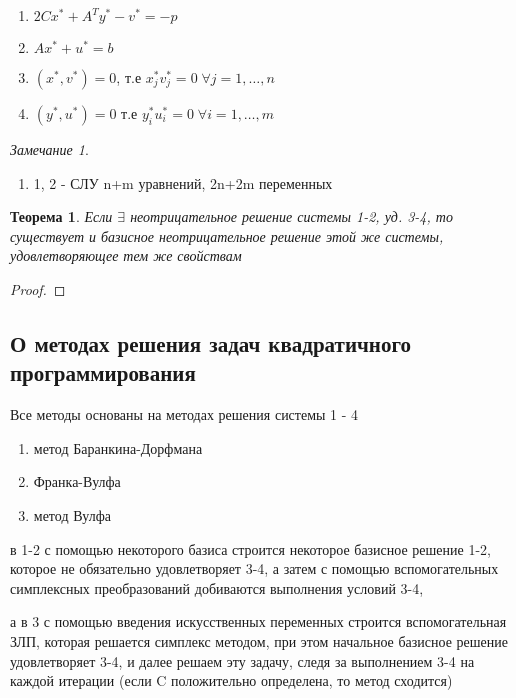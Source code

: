 \documentclass[a4paper]{article}
\newtheorem{theorem}{Теорема}[section]
\theoremstyle{definition}
\theoremstyle{remark}
\newtheorem*{remark}{Замечание}
\begin{document}
\begin{enumerate}
    \item $2Cx^* + A^T y^* - v^* = -p$
    \item $Ax^* + u^* = b$
    \item $(x^*, v^*) = 0$, т.е $x_j^* v_j^* = 0\; \forall j = 1, \dots, n$
    \item $(y^*, u^*) = 0$ т.е $y_i^* u_i^* = 0\; \forall i = 1, \dots, m$
\end{enumerate}  
\begin{remark}
    \begin{enumerate}
        \item 1, 2 - СЛУ n+m уравнений, 2n+2m переменных
    \end{enumerate}
\end{remark}
\begin{theorem}
    Если $\exists$ неотрицательное решение системы 1-2, уд. 3-4, то существует и базисное неотрицательное решение этой же системы, удовлетворяющее тем же свойствам
\end{theorem}
\begin{proof}

\end{proof}
\subsection{О методах решения задач квадратичного программирования}
Все методы основаны на методах решения системы 1 - 4 

\begin{enumerate}
    \item метод Баранкина-Дорфмана
    \item Франка-Вулфа
    \item метод Вулфа
\end{enumerate}
в 1-2 с помощью некоторого базиса строится некоторое базисное решение 1-2, которое не обязательно удовлетворяет 3-4, а затем с помощью вспомогательных симплексных преобразований добиваются выполнения условий 3-4,

а в 3 с помощью введения искусственных переменных строится вспомогательная ЗЛП, которая решается симплекс методом, при этом начальное базисное решение удовлетворяет 3-4, и далее решаем эту задачу, следя за выполнением 3-4 на каждой итерации (если C положительно определена, то метод сходится)
\end{document}
